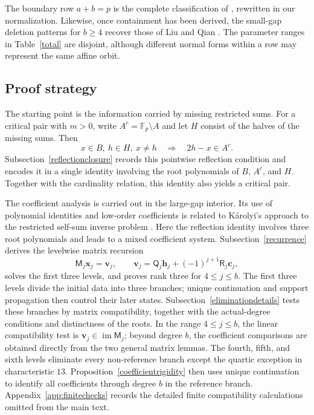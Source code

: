 \documentclass[10pt,a4paper]{amsart}
\newcommand{\F}{\mathbb{F}_p}
\begin{document}
The boundary row $a+b=p$ is the complete classification of
\cite[Theorem 1.1]{HLY}, rewritten in our normalization.  Likewise, once
containment has been derived, the small-gap deletion patterns for $b\ge4$
recover those of Liu and Qian \cite[Propositions 3.2(i) and 3.4]{LQ}.
The parameter ranges in Table~\ref{total} are disjoint, although
different normal forms within a row may represent the same affine orbit.

\subsection{Proof strategy}

The starting point is the information carried by missing restricted sums.
For a critical pair with $m>0$, write $A^c=\F\setminus A$ and let $H$
consist of the halves of the missing sums.  Then
\[
 x\in B,\ h\in H,\ x\ne h\quad\Longrightarrow\quad2h-x\in A^c.
\]
Subsection~\ref{reflectionclosure} records this pointwise reflection
condition and encodes it in a single identity involving the
root polynomials of $B$, $A^c$, and $H$.  Together with the cardinality
relation, this identity also yields a critical pair.

The coefficient analysis is carried out in the large-gap interior.
Its use of polynomial identities and low-order coefficients is related
to K\'arolyi's approach to the restricted self-sum inverse problem
\cite[Section 2]{Karolyi}.  Here the reflection identity involves three
root polynomials and leads to a mixed coefficient system.
Subsection~\ref{recurrence} derives the levelwise matrix recursion
\[
 \mathsf M_j\mathbf x_j=\mathbf v_j,
 \qquad
 \mathbf v_j=\mathsf Q_j\mathbf h_j+(-1)^{j+1}\mathsf R_j\mathbf c_j,
\]
solves the first three levels, and proves rank three for
$4\le j\le b$.  The first three levels divide the initial data into
three branches; unique continuation and support propagation then
control their later states.  Subsection~\ref{eliminationdetails} tests
these branches by matrix compatibility, together with the actual-degree
conditions and distinctness of the roots.  In the range $4\le j\le b$,
the linear compatibility test is
$\mathbf v_j\in\operatorname{im}\mathsf M_j$; beyond degree $b$, the
coefficient comparisons are obtained directly from the two general
matrix lemmas.  The fourth, fifth, and sixth levels eliminate every
non-reference branch except the quartic exception in characteristic
$13$.  Proposition~\ref{coefficientrigidity} then uses
unique continuation to identify all coefficients through degree $b$ in
the reference branch.  Appendix~\ref{app:finitechecks} records the
detailed finite compatibility calculations omitted from the main text.
\end{document}
